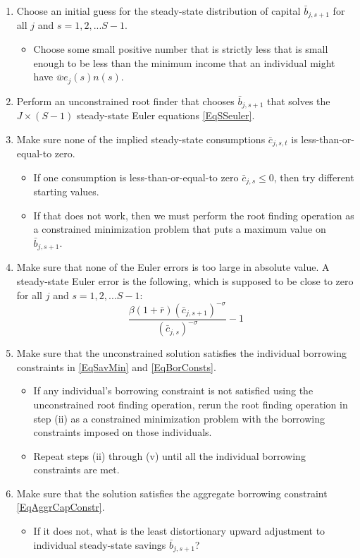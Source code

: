 \documentclass[letterpaper,12pt]{article}
\theoremstyle{definition}
\begin{document}
  \begin{enumerate}
    \item Choose an initial guess for the steady-state distribution of capital $\bar{b}_{j,s+1}$ for all $j$ and $s=1,2,...S-1$.
      \begin{itemize}
        \item Choose some small positive number that is strictly less that is small enough to be less than the minimum income that an individual might have $\bar{w}e_j(s)n(s)$.
      \end{itemize}
    \item Perform an unconstrained root finder that chooses $\bar{b}_{j,s+1}$ that solves the $J\times(S-1)$ steady-state Euler equations \eqref{EqSSeuler}.
    \item Make sure none of the implied steady-state consumptions $\bar{c}_{j,s,t}$ is less-than-or-equal-to zero.
      \begin{itemize}
        \item If one consumption is less-than-or-equal-to zero $\bar{c}_{j,s}\leq 0$, then try different starting values.
        \item If that does not work, then we must perform the root finding operation as a constrained minimization problem that puts a maximum value on $\bar{b}_{j,s+1}$.
      \end{itemize}
    \item Make sure that none of the Euler errors is too large in absolute value. A steady-state Euler error is the following, which is supposed to be close to zero for all $j$ and $s=1,2,...S-1$:
      \begin{equation}\label{EqSSeulerr}
        \frac{\beta \left(1+\bar{r}\right)\left(\bar{c}_{j,s+1}\right)^{-\sigma}}{\left(\bar{c}_{j,s}\right)^{-\sigma}} - 1
      \end{equation}
    \item Make sure that the unconstrained solution satisfies the individual borrowing constraints in \eqref{EqSavMin} and \eqref{EqBorConsts}.
      \begin{itemize}
        \item If any individual's borrowing constraint is not satisfied using the unconstrained root finding operation, rerun the root finding operation in step (ii) as a constrained minimization problem with the borrowing constraints imposed on those individuals.
        \item Repeat steps (ii) through (v) until all the individual borrowing constraints are met.
      \end{itemize}
    \item Make sure that the solution satisfies the aggregate borrowing constraint \eqref{EqAggrCapConstr}.
      \begin{itemize}
        \item If it does not, what is the least distortionary upward adjustment to individual steady-state savings $\bar{b}_{j,s+1}$?
      \end{itemize}
  \end{enumerate}
\end{document}
